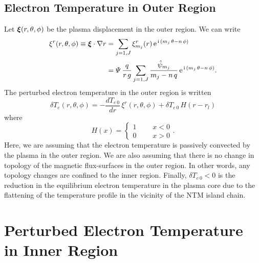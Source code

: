 \documentclass[12pt,prb,aps]{revtex4-1}
\newcommand {\bxi}{\mbox{\boldmath$\xi$}}
\begin{document}
\subsection{Electron Temperature in Outer Region}
Let $\bxi(r,\theta,\phi)$ be the plasma displacement in the outer region. We can write\,\cite{tear10}
\begin{align}\label{xi}
\xi^r(r,\theta,\phi)\equiv \bxi\cdot\nabla r& = \sum_{j=1,J}\xi_{m_j}^r(r)\,{\rm e}^{\,{\rm i}\,(m_j\,\theta-n\,\phi)}\nonumber\\[0.5ex]
&=
{\mit\Psi}\,\frac{q}{r\,g}\sum_{j=1,J}\frac{\hat{\psi}_{m_j}}{m_j-n\,q}\, {\rm e}^{\,{\rm i}\,(m_j\,\theta-n\,\phi)}.
\end{align}
The perturbed electron temperature  in the outer region is written
\begin{equation}
\delta T_e(r,\theta,\phi)= -\frac{dT_{e\,0}}{dr}\, \xi^r(r,\theta,\phi) + \delta T_{e\,0}\,H(r-r_{l})
\end{equation}
where
\begin{equation}
H(x)= \left\{\begin{array}{ccc}1&~~~&x<0\\0&&x>0\end{array}\right..
\end{equation}
Here, we are assuming that the electron temperature is passively convected by the plasma in the outer region. We are also
assuming that there is no change in topology of the magnetic flux-surfaces in the outer region. In other words, any topology changes are
confined to  the inner region. Finally, $\delta T_{e\,0}<0$ is the reduction in the equilibrium electron temperature in the plasma
core due to the flattening of the temperature profile in the vicinity of the NTM island chain.\cite{chang}

\section{Perturbed Electron Temperature  in Inner Region}\label{s4}
\end{document}
